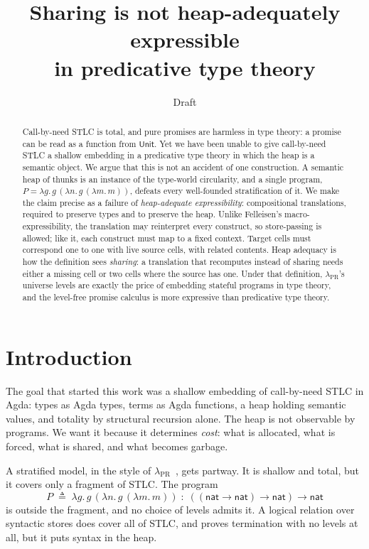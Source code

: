 \documentclass[11pt]{article}
\title{Sharing is not heap-adequately expressible\\
       in predicative type theory}
\author{}
\date{Draft}
\theoremstyle{remark}
\newcommand{\lpr}{\lambda_{\mathrm{PR}}}
\newcommand{\Unit}{\mathsf{Unit}}
\newcommand{\snat}{\mathsf{nat}}
\newcommand{\slam}[1]{\lambda #1.\,}
\begin{document}
\maketitle

\begin{abstract}
  Call-by-need STLC is total, and pure promises are harmless in type theory:
  a promise can be read as a function from $\Unit$. Yet we have been unable
  to give call-by-need STLC a shallow embedding in a predicative type theory
  in which the heap is a semantic object. We argue that this is not an
  accident of one construction. A semantic heap of thunks is an instance of
  the type-world circularity, and a single program, $P = \slam{g} g\,(\slam{n}
  g\,(\slam{m} m))$, defeats every well-founded stratification of it. We
  make the claim precise as a failure of \emph{heap-adequate
  expressibility}: compositional translations, required to preserve types
  and to preserve the heap. Unlike Felleisen's macro-expressibility, the
  translation may reinterpret every construct, so store-passing is allowed;
  like it, each construct must map to a fixed context. Target cells must correspond one
  to one with live source cells, with related contents. Heap adequacy is how
  the definition sees \emph{sharing}: a translation that recomputes instead
  of sharing needs either a missing cell or two cells where the source has
  one. Under that definition, $\lpr$'s universe levels are exactly the price
  of embedding stateful programs in type theory, and the level-free promise
  calculus is more expressive than predicative type theory.
\end{abstract}

\section{Introduction}

The goal that started this work was a shallow embedding of call-by-need STLC
in Agda: types as Agda types, terms as Agda functions, a heap holding
semantic values, and totality by structural recursion alone. The heap is not
observable by programs. We want it because it determines \emph{cost}: what is
allocated, what is forced, what is shared, and what becomes garbage.

A stratified model, in the style of $\lpr$~\cite{koronkevich2025}, gets
partway. It is shallow and total, but it covers only a fragment of STLC. The
program
\[
  P \;\triangleq\; \slam{g} g\,(\slam{n} g\,(\slam{m} m))
  \;:\; ((\snat \to \snat) \to \snat) \to \snat
\]
is outside the fragment, and no choice of levels admits it. A logical
relation over syntactic stores does cover all of STLC, and proves
termination with no levels at all, but it puts syntax in the heap.
\end{document}
